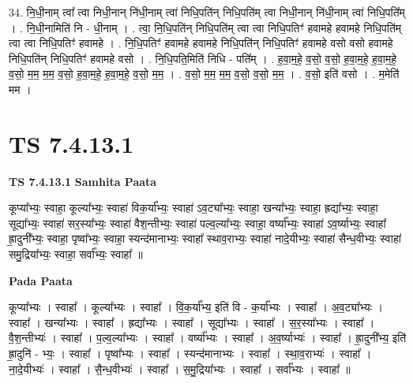\documentclass[17pt]{extarticle}
\begin{document}
34. नि॒धी॒नाम् त्वा᳚ त्वा निधी॒नान् नि॑धी॒नाम् त्वा॑ निधि॒पति॑न् निधि॒पति॑म् त्वा निधी॒नान् नि॑धी॒नाम् त्वा॑ निधि॒पति᳚म् । . नि॒धी॒नामिति॑ नि - धी॒नाम् । . त्वा॒ नि॒धि॒पति॑न् निधि॒पति॑म् त्वा त्वा निधि॒पतिꣳ॑ हवामहे हवामहे निधि॒पति॑म् त्वा त्वा निधि॒पतिꣳ॑ हवामहे । . नि॒धि॒पतिꣳ॑ हवामहे हवामहे निधि॒पति॑न् निधि॒पतिꣳ॑ हवामहे वसो वसो हवामहे निधि॒पति॑न् निधि॒पतिꣳ॑ हवामहे वसो । . नि॒धि॒पति॒मिति॑ निधि - पति᳚म् । . ह॒वा॒म॒हे॒ व॒सो॒ व॒सो॒ ह॒वा॒म॒हे॒ ह॒वा॒म॒हे॒ व॒सो॒ म॒म॒ म॒म॒ व॒सो॒ ह॒वा॒म॒हे॒ ह॒वा॒म॒हे॒ व॒सो॒ म॒म॒ । . व॒सो॒ म॒म॒ म॒म॒ व॒सो॒ व॒सो॒ म॒म॒ । . व॒सो॒ इति॑ वसो । . म॒मेति॑ मम । \newline
\pagebreak
{}

\section{ TS 7.4.13.1 }

\textbf{TS 7.4.13.1 } \newline
\textbf{Samhita Paata} \newline

कूप्या᳚भ्यः॒ स्वाहा॒ कूल्या᳚भ्यः॒ स्वाहा॑ विक॒र्या᳚भ्यः॒ स्वाहा॑ ऽव॒ट्या᳚भ्यः॒ स्वाहा॒ खन्या᳚भ्यः॒ स्वाहा॒ ह्रद्या᳚भ्यः॒ स्वाहा॒ सूद्या᳚भ्यः॒ स्वाहा॑ सर॒स्या᳚भ्यः॒ स्वाहा॑ वैश॒न्तीभ्यः॒ स्वाहा॑ पल्व॒ल्या᳚भ्यः॒ स्वाहा॒ वर्ष्या᳚भ्यः॒ स्वाहा॑ ऽव॒र्ष्याभ्यः॒ स्वाहा᳚ ह्रा॒दुनी᳚भ्यः॒ स्वाहा॒ पृष्वा᳚भ्यः॒ स्वाहा॒ स्यन्द॑मानाभ्यः॒ स्वाहा᳚ स्थाव॒राभ्यः॒ स्वाहा॑ नादे॒यीभ्यः॒ स्वाहा॑ सैन्ध॒वीभ्यः॒ स्वाहा॑ समु॒द्रिया᳚भ्यः॒ स्वाहा॒ सर्वा᳚भ्यः॒ स्वाहा᳚ ॥ \newline

\textbf{Pada Paata} \newline

कूप्या᳚भ्यः । स्वाहा᳚ । कूल्या᳚भ्यः । स्वाहा᳚ । वि॒क॒र्या᳚भ्य॒ इति॑ वि - क॒र्या᳚भ्यः । स्वाहा᳚ । अ॒व॒ट्या᳚भ्यः । स्वाहा᳚ । खन्या᳚भ्यः । स्वाहा᳚ । ह्रद्या᳚भ्यः । स्वाहा᳚ । सूद्या᳚भ्यः । स्वाहा᳚ । स॒र॒स्या᳚भ्यः । स्वाहा᳚ । वै॒श॒न्तीभ्यः॑ । स्वाहा᳚ । प॒ल्व॒ल्या᳚भ्यः । स्वाहा᳚ । वर्ष्या᳚भ्यः । स्वाहा᳚ । अ॒व॒र्ष्याभ्यः॑ । स्वाहा᳚ । ह्रा॒दुनी᳚भ्य॒ इति॑ ह्रा॒दुनि॑ - भ्यः॒ । स्वाहा᳚ । पृष्वा᳚भ्यः । स्वाहा᳚ । स्यन्द॑मानाभ्यः । स्वाहा᳚ । स्था॒व॒राभ्यः॑ । स्वाहा᳚ । ना॒दे॒यीभ्यः॑ । स्वाहा᳚ । सै॒न्ध॒वीभ्यः॑ । स्वाहा᳚ । स॒मु॒द्रिया᳚भ्यः । स्वाहा᳚ । सर्वा᳚भ्यः । स्वाहा᳚ ॥  \newline
\end{document}
